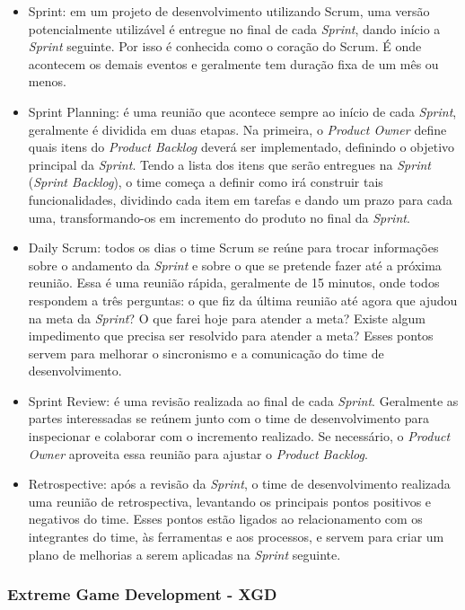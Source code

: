 \documentclass[quali]{ppgccufscar}
\begin{document}
\begin{itemize}
	\item Sprint: em um projeto de desenvolvimento utilizando Scrum, uma versão potencialmente utilizável é entregue no final de cada \textit{Sprint}, dando início a \textit{Sprint} seguinte. Por isso é conhecida como o coração do Scrum. É onde acontecem os demais eventos e geralmente tem duração fixa de um mês ou menos. 
	\item Sprint Planning: é uma reunião que acontece sempre ao início de cada \textit{Sprint}, geralmente é dividida em duas etapas. Na primeira, o \textit{Product Owner} define quais itens do \textit{Product Backlog} deverá ser implementado, definindo o objetivo principal da \textit{Sprint}. Tendo a lista dos itens que serão entregues na \textit{Sprint} (\textit{Sprint Backlog}), o time começa a definir como irá construir tais funcionalidades, dividindo cada item em tarefas e dando um prazo para cada uma, transformando-os em incremento do produto no final da \textit{Sprint}.
	\item Daily Scrum: todos os dias o time Scrum se reúne para trocar informações sobre o andamento da \textit{Sprint} e sobre o que se pretende fazer até a próxima reunião. Essa é uma reunião rápida, geralmente de 15 minutos, onde todos respondem a três perguntas: o que fiz da última reunião até agora que ajudou na meta da \textit{Sprint}? O que farei hoje para atender a meta? Existe algum impedimento que precisa ser resolvido para atender a meta? Esses pontos servem para melhorar o sincronismo e a comunicação do time de desenvolvimento.
	\item Sprint Review: é uma revisão realizada ao final de cada \textit{Sprint}. Geralmente as partes interessadas se reúnem junto com o time de desenvolvimento para inspecionar e colaborar com o incremento realizado. Se necessário, o \textit{Product Owner} aproveita essa reunião para ajustar o \textit{Product Backlog}.
	\item Retrospective: após a revisão da \textit{Sprint}, o time de desenvolvimento realizada uma reunião de retrospectiva, levantando os principais pontos positivos e negativos do time. Esses pontos estão ligados ao relacionamento com os integrantes do time, às ferramentas e aos processos, e servem para criar um plano de melhorias a serem aplicadas na \textit{Sprint} seguinte.
\end{itemize}


\subsubsection{Extreme Game Development - XGD}
\end{document}
